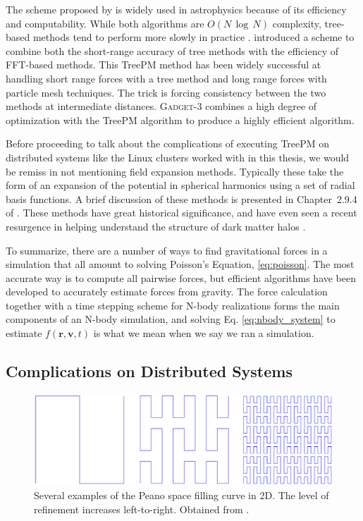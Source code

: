 The scheme proposed by \citet{barnes_hut} is widely used in astrophysics because of its efficiency and computability. While both algorithms are $O(N\,\log\, N)$ complexity, tree-based methods tend to perform more slowly in practice \citep{GadgetCodePaper}. \citet{xu_treepm} introduced a scheme to combine both the short-range accuracy of tree methods with the efficiency of FFT-based methods. This TreePM method has been widely successful at handling short range forces with a tree method and long range forces with particle mesh techniques. The trick is forcing consistency between the two methods at intermediate distances. \textsc{Gadget-3} combines a high degree of optimization with the TreePM algorithm to produce a highly efficient algorithm.

Before proceeding to talk about the complications of executing TreePM on distributed systems like the Linux clusters worked with in this thesis, we would be remiss in not mentioning field expansion methods. Typically these take the form of an expansion of the potential in spherical harmonics using a set of radial basis functions. A brief discussion of these methods is presented in Chapter~2.9.4 of \citet{BT}. These methods have great historical significance, and have even seen a recent resurgence in helping understand the structure of dark matter halos \citep{lilley_2018_a, lilley_2018_b}.

To summarize, there are a number of ways to find gravitational forces in a simulation that all amount to solving Poisson's Equation, \eqref{eq:poisson}. The most accurate way is to compute all pairwise forces, but efficient algorithms have been developed to accurately estimate forces from gravity. The force calculation together with a time stepping scheme for N-body realizations forms the main components of an N-body simulation, and solving Eq. \eqref{eq:nbody_system} to estimate $f(\textbf{r},\textbf{v},t)$ is what we mean when we say we ran a simulation.

\subsection{Complications on Distributed Systems}

\begin{figure}
	\centering
	\includegraphics[width=\textwidth]{../figures/Peanocurve.eps}
	\caption{Several examples of the Peano space filling curve in 2D. The level of refinement increases left-to-right. Obtained from \citet{peano}.}\label{fig:peano}
\end{figure}

